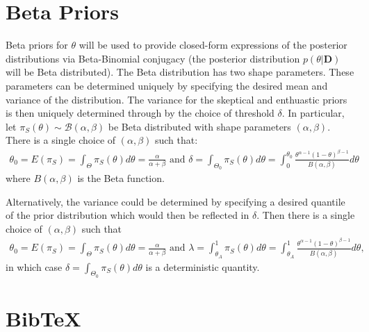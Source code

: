 \documentclass[12pt]{article}
\begin{document}
\section{Beta Priors}
Beta priors for $\theta$ will be used to provide closed-form expressions of the posterior distributions via Beta-Binomial conjugacy (the posterior distribution $p(\theta|\mathbf{D})$ will be Beta distributed). The Beta distribution has two shape parameters. These parameters can be determined uniquely by specifying the desired mean and variance of the distribution.  The variance for the skeptical and enthuastic priors is then uniquely determined through by the choice of threshold $\delta$. In particular, let $\pi_S(\theta)\sim \mathcal{B}(\alpha,\beta)$ be Beta distributed with shape parameters $(\alpha,\beta)$. There is a single choice of $(\alpha,\beta)$ such that:
\begin{align*}
\theta_0=E(\pi_S)=\int_{\Theta}\pi_S(\theta)d\theta=\frac{\alpha}{\alpha+\beta}\text{ and }\delta=\int_{\Theta_0}\pi_S(\theta)d\theta=\int_{0}^{\theta_0}\frac{\theta^{\alpha-1}(1-\theta)^{\beta-1}}{B(\alpha,\beta)}d\theta
\end{align*}
where $B(\alpha,\beta)$ is the Beta function.

Alternatively, the variance could be determined by specifying a desired quantile of the prior distribution which would then be reflected in $\delta$.  Then there is a single choice of $(\alpha,\beta)$ such that
\begin{align*}
\theta_0=E(\pi_S)=\int_{\Theta}\pi_S(\theta)d\theta=\frac{\alpha}{\alpha+\beta}\text{ and }\lambda=\int_{\theta_A}^{1}\pi_S(\theta)d\theta=\int_{\theta_A}^{1}\frac{\theta^{\alpha-1}(1-\theta)^{\beta-1}}{B(\alpha,\beta)}d\theta,
\end{align*}
in which case $\delta=\int_{\Theta_0}\pi_S(\theta)d\theta$ is a deterministic quantity.
\section{BibTeX}

 
 		
\end{document}
